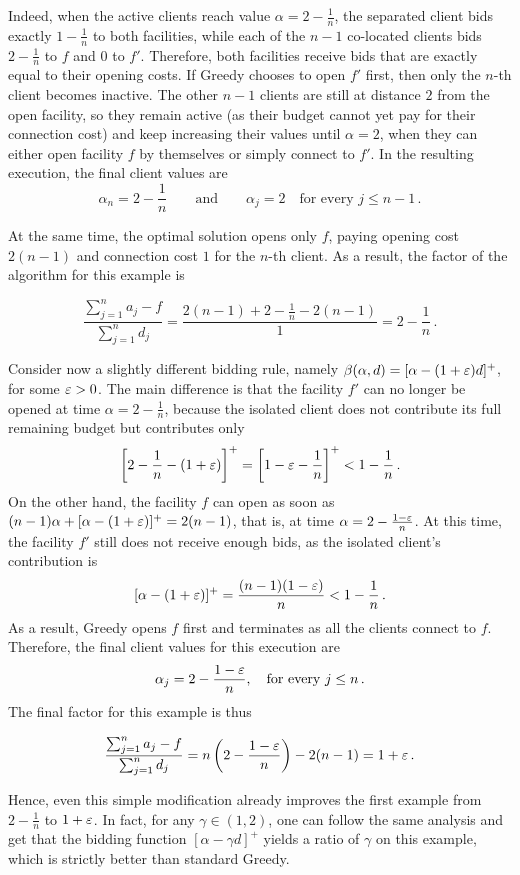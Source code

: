 Indeed, when the active clients reach value $\alpha = 2-\frac1n$, the separated client bids exactly $1-\frac1n$ to both facilities, while each of the $n-1$ co-located clients bids $2-\frac1n$ to $f$ and $0$ to $f'$. Therefore, both facilities receive bids that are exactly equal to their opening costs. If Greedy chooses to open $f'$ first, then only the $n$-th client becomes inactive. The other $n-1$ clients are still at distance $2$ from the open facility, so they remain active (as their budget cannot yet pay for their connection cost) and keep increasing their values until $\alpha=2$, when they can either open facility $f$ by themselves or simply connect to $f'$.
In the resulting execution, the final client values are
\[
    \alpha_n = 2-\frac1n 
    \qquad\text{and}\qquad
    \alpha_j = 2 \quad \text{for every } j \leq n-1\,.
\]

\noindent At the same time, the optimal solution opens only $f$, paying opening cost $2(n-1)$ and connection cost $1$ for the $n$-th client. As a result, the factor of the algorithm for this example is

$$
\frac{\sum_{j = 1}^n a_j - f}{\sum_{j=1}^n d_j} = \frac{2(n-1) + 2-\frac1n - 2(n-1)}{1} = 2-\frac1n\,.
$$


Consider now a slightly different bidding rule, namely $\beta(\alpha,d)=[\alpha-(1+\varepsilon)d]^+$, for some $\varepsilon>0$.
The main difference is that the facility $f'$ can no longer be opened at time $\alpha = 2-\frac1n$, because the isolated client does not contribute its full remaining budget but contributes only
\[
    \left[2-\frac1n-(1+\varepsilon)\right]^+
    =
    \left[1-\varepsilon-\frac1n\right]^+
    <
    1-\frac1n\,.
\]
On the other hand, the facility $f$ can open as soon as $(n-1)\alpha + [\alpha-(1+\varepsilon)]^+ = 2(n-1)$, that is, at time $\alpha = 2-\frac{1-\varepsilon}{n}$. At this time, the facility $f'$ still does not receive enough bids, as the isolated client's contribution is
\[
    [\alpha-(1+\varepsilon)]^+ = \frac{(n-1)(1-\varepsilon)}{n} < 1-\frac1n\,.
\]
\noindent As a result, Greedy opens $f$ first and terminates as all the clients connect to $f$. 
Therefore, the final client values for this execution are 
\[
    \alpha_j = 2-\frac{1-\varepsilon}{n}, \quad \text{for every } j \leq n\,.
\]
The final factor for this example is thus

$$
\frac{\sum_{j = 1}^n a_j - f}{\sum_{j = 1}^n d_j} =  n\left(2-\frac{1-\varepsilon}{n}\right)-2(n-1)=1+\varepsilon\,.
$$

\noindent Hence, even this simple modification already improves the first example from $2-\frac1n$ to $1+\varepsilon$. In fact, for any $\gamma \in (1,2)$, one can follow the same analysis and get that the bidding function $[\alpha-\gamma d]^+$ yields a ratio of $\gamma$ on this example, which is strictly better than standard Greedy.


